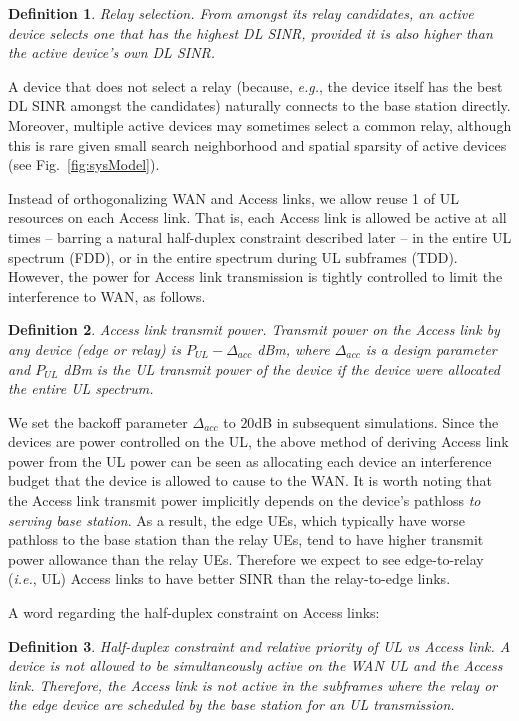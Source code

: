 \documentclass[journal]{IEEEtran}
\newtheorem{definit}{Definition}
\newcommand{\ie}{\emph{i.e.}}
\newcommand{\eg}{\emph{e.g.}}
\begin{document}
\begin{definit}\label{def:rlySelect}
	{\em Relay selection.} From amongst its relay candidates, an active device selects one that has the highest DL SINR, provided it is also higher than the active device's own DL SINR.
\end{definit}

A device that does not select a relay (because, \eg, the device itself has the best DL SINR amongst the candidates) naturally connects to the base station directly.  Moreover, multiple active devices may sometimes select a common relay, although this is rare given small search neighborhood and spatial sparsity of active devices (see Fig.~\ref{fig:sysModel}).

Instead of orthogonalizing WAN and Access links, we allow reuse 1 of UL resources on each Access link.  That is, each Access link is allowed be active at all times -- barring a natural half-duplex constraint described later -- in the entire UL spectrum (FDD), or in the entire spectrum during UL subframes (TDD).  However, the power for Access link transmission is tightly controlled to limit the interference to WAN, as follows.

\begin{definit}\label{def:txPower}
	{\em Access link transmit power.} Transmit power on the Access link by any device (edge or relay) is $P_{UL}-\Delta_{acc}$ dBm, where $\Delta_{acc}$ is a design parameter and $P_{UL}$ dBm is the UL transmit power of the device if the device were allocated the entire UL spectrum.
\end{definit}

We set the backoff parameter $\Delta_{acc}$ to $20$dB in subsequent simulations. Since the devices are power controlled on the UL, the above method of deriving Access link power from the UL power can be seen as allocating each device an interference budget that the device is allowed to cause to the WAN. It is worth noting that the Access link transmit power implicitly depends on the device's pathloss {\em to serving  base station}.  As a result, the edge UEs, which typically have worse pathloss to the base station than the relay UEs, tend to have higher transmit power allowance than the relay UEs. Therefore we expect to see edge-to-relay (\ie, UL) Access links to have better SINR than the relay-to-edge links.

A word regarding the half-duplex constraint on Access links:
\begin{definit}
    {\em Half-duplex constraint and relative priority of UL vs Access link.} A device is not allowed to be simultaneously active on the WAN UL and the Access link. Therefore, the Access link is not active in the subframes where the relay or the edge device are scheduled by the base station for an UL transmission.
\end{definit}
\end{document}
